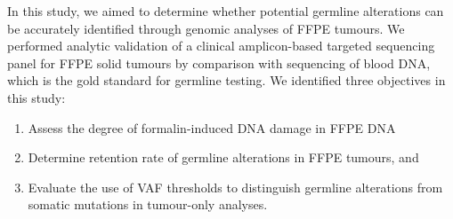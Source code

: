 In this study, we aimed to determine whether potential germline alterations can be accurately identified through genomic analyses of FFPE tumours. We performed analytic validation of a clinical amplicon-based targeted sequencing panel for FFPE solid tumours by comparison with sequencing of blood DNA, which is the gold standard for germline testing. We identified three objectives in this study:

\begin{enumerate}
\item Assess the degree of formalin-induced DNA damage in FFPE DNA
\item Determine retention rate of germline alterations in FFPE tumours, and
\item Evaluate the use of VAF thresholds to distinguish germline alterations from somatic mutations in tumour-only analyses.
\end{enumerate}


\endinput


Both von Hansemann and Boveri observed unequal chromosomal segregations in tumour cells, which prompted their speculations that tumour development is induced by anomalies in hereditary material \cite{VonHansemann1890, Boveri1914}. An observation that drew Boveri's attention is that not all chromosomal imbalanced cells proliferated uncontrollably and formed tumours, there were some that resulted in cell death. This led Boveri to further hypothesize that genetic materials are functionally different, and tumour formation is promoted by retention of chromatin parts that stimulate growth or elimination of those that inhibit growth, concepts that manifested in the present knowledge of oncogenes and tumour-suppressor genes, respectively \cite{Boveri1914}.

